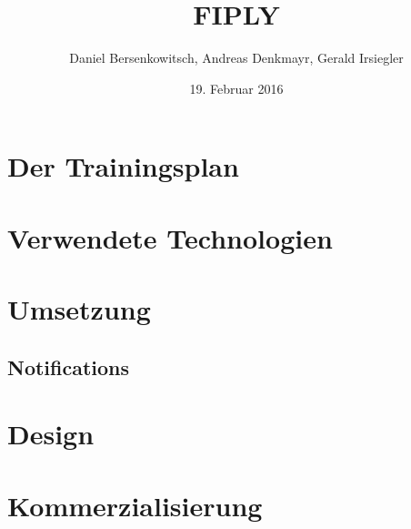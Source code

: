 \documentclass[a4paper, 12pt]{article}
\title{FIPLY}
\author{Daniel Bersenkowitsch, Andreas Denkmayr, Gerald Irsiegler}
\date{19. Februar 2016}
\begin{document}
\maketitle
\tableofcontents

\newpage %



\newpage %
\section{Der Trainingsplan}



\newpage %
\section{Verwendete Technologien}

\newpage


\newpage





\newpage %

\newpage



\newpage %
\section{Umsetzung}

\newpage

\newpage

\newpage

\newpage

\newpage

\newpage

\newpage

\newpage

\newpage

\newpage

\newpage

\newpage

\newpage
\subsection{Notifications}

\newpage


\newpage %
\section{Design} 


\newpage %
\section{Kommerzialisierung}
\newpage

\newpage

\newpage
 
\newpage
 
\newpage
 
\newpage

\newpage
 


\newpage
\printbibliography
\end{document}
